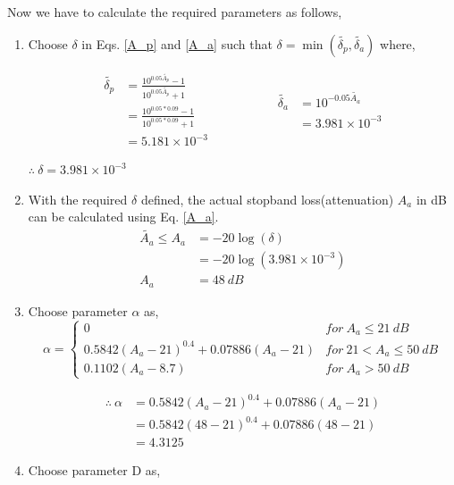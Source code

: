 \documentclass[a4paper,11pt]{article}%
\begin{document}
Now we have to calculate the required parameters as follows,

\begin{enumerate}[\hspace{1cm}a.)]
\item Choose $\delta$ in Eqs. \eqref{A_p} and \eqref{A_a} such that $\delta = \min(\tilde{\delta_p}, \tilde{\delta_a})$ where,

\[
\begin{split}
	\tilde{\delta_p} &= \frac{10^{0.05\tilde{A_p}}-1}{10^{0.05\tilde{A_p}}+1}\\
	&=\frac{10^{0.05*0.09}-1}{10^{0.05*0.09}+1}\\
	&=5.181\times10^{-3}
\end{split}
\hspace{2cm}
\begin{split}
	\tilde{\delta_a} &= 10^{-0.05\tilde{A_a}}\\
&=3.981\times10^{-3}
\end{split}
\]
\begin{center}
	$\therefore~ \delta = 3.981\times10^{-3} $
\end{center}

\item With the required $\delta$ defined, the actual stopband loss(attenuation) $A_a$ in dB can be calculated using Eq. \ref{A_a}.
\[
\begin{split}
	 \tilde{A_a} \le A_a &= -20\log(\delta)\\
	 &=-20\log(3.981\times10^{-3})\\
	A_a &= 48 ~dB
\end{split}
\]

\item Choose parameter $\alpha$ as,
    \[
\alpha = \begin{cases}
	0 & for~  A_a \leq 21 ~dB \\
	0.5842(A_a - 21)^{0.4} + 0.07886(A_a - 21) & for ~ 21 < A_a \leq 50 ~dB \\
	0.1102(A_a - 8.7) & for~  A_a > 50 ~dB
\end{cases}
\]

\[
\begin{split}
\therefore~ \alpha &= 0.5842(A_a - 21)^{0.4} + 0.07886(A_a - 21)\\
&=	0.5842(48 - 21)^{0.4} + 0.07886(48 - 21)\\
&=4.3125
\end{split}
\]

\item Choose parameter D as,


\end{enumerate}
\end{document}
